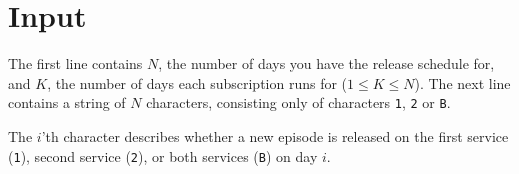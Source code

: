 



% 
% 
% 

\section*{Input}
The first line contains $N$, the number of days you have the release schedule for, and $K$, the number of days each subscription runs for ($1 \le K \le N$).
The next line contains a string of $N$ characters, consisting only of characters \texttt{1}, \texttt{2} or \texttt{B}.

The $i$'th character describes whether a new episode is released on the first service (\texttt{1}), second service (\texttt{2}), or both services (\texttt{B}) on day $i$.

